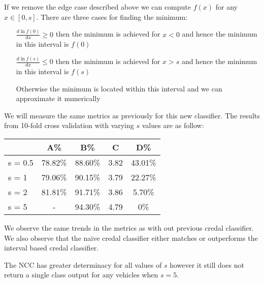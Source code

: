 If we remove the edge case described above we can compute $f(x)$ for any $x \in [0, s]$.
There are three cases for finding the minimum:
\begin{itemize}
	\item[$\frac{d\ln f(0)}{dx} \geq 0$] then the minimum is achieved for $x<0$ and hence the minimum in this interval is $f(0)$
	\item[$\frac{d\ln f(s)}{dx} \leq 0$] then the minimum is achieved for $x>s$ and hence the minimum in this interval is $f(s)$
	\item[Otherwise] the minimum is located within this interval and we can approximate it numerically
\end{itemize}

We will measure the same metrics as previously for this new classifier.
The results from 10-fold cross validation with varying $s$ values are as follow:
\begin{center}
\begin{tabular}{l|c c c c}
        & A\%     & B\%     & C    & D\%     \\
\hline
s = 0.5 & 78.82\% & 88.60\% & 3.82 & 43.01\% \\
s = 1   & 79.06\% & 90.15\% & 3.79 & 22.27\% \\
s = 2   & 81.81\% & 91.71\% & 3.86 & 5.70\% \\
s = 5   & -       & 94.30\% & 4.79 & 0\%   \\
\end{tabular}
\end{center}

We observe the same trends in the metrics as with out previous credal classifier.
We also observe that the naive credal classifier either matches or outperforms the interval based credal classifier.

The NCC has greater determinacy for all values of $s$ however it still does not return a single class output for any vehicles when $s=5$.
